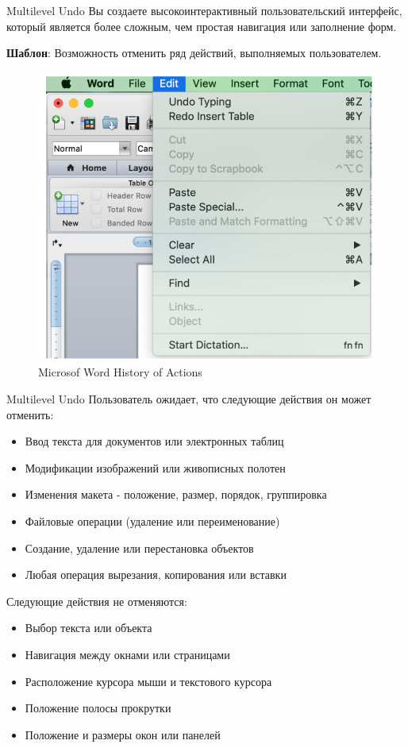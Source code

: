 \documentclass{beamer}
\begin{document}
\begin{frame}[t]{Multilevel Undo}
	Вы создаете высокоинтерактивный пользовательский интерфейс, который является более сложным, чем простая навигация или заполнение форм.
	
	\textbf{Шаблон}: Возможность отменить ряд действий, выполняемых пользователем.
	\begin{figure}[h]
		\centering
		\includegraphics[scale=0.6]{images/lec08-pic24.png}
		\caption{Microsof Word History of Actions}
	\end{figure}
\end{frame}

\begin{frame}[t]{Multilevel Undo}
	Пользователь ожидает, что следующие действия он может отменить:
	\begin{itemize}
		\item Ввод текста для документов или электронных таблиц
		\item Модификации изображений или живописных полотен
		\item Изменения макета - положение, размер, порядок, группировка
		\item Файловые операции (удаление или переименование)
		\item Создание, удаление или перестановка объектов
		\item Любая операция вырезания, копирования или вставки
	\end{itemize}
	Следующие действия не отменяются:
	\begin{itemize}
		\item Выбор текста или объекта
		\item Навигация между окнами или страницами
		\item Расположение курсора мыши и текстового курсора
		\item Положение полосы прокрутки
		\item Положение и размеры окон или панелей
	\end{itemize}	
\end{frame}
\end{document}
